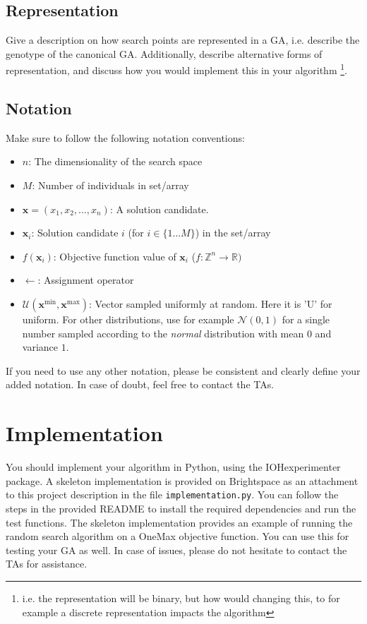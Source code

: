 \documentclass[runningheads]{llncs}
\begin{document}
\subsection{Representation}
Give a description on how search points are represented in a GA, i.e. describe the genotype of the canonical GA. Additionally, describe alternative forms of representation, and discuss how you would implement this in your algorithm \footnote{i.e. the representation will be binary, but how would changing this, to for example a discrete representation impacts the algorithm}. 


\subsection{Notation}
Make sure to follow the following notation conventions:
\begin{itemize}
    \item $n$: The dimensionality of the search space
    \item $M$: Number of individuals in set/array
    \item $\mathbf{x}=(x_1,x_2,\dots,x_n)$: A solution candidate. 
    \item $\mathbf{x}_i$: Solution candidate $i$ (for $i \in \{1\dots M\}$) in the set/array
    \item $f(\mathbf{x}_i)$: Objective function value of $\mathbf{x}_i$ ($f: \mathds{Z}^n \rightarrow \mathds{R})$
    \item $\leftarrow$: Assignment operator
    \item $\bm{\mathcal{U}}(\mathbf{x}^{\text{min}},\mathbf{x}^{\text{max}} )$: Vector sampled uniformly at random. Here it is 'U' for uniform. For other distributions, use for example $\bm{\mathcal{N}}(0,1)$ for a single number sampled according to the \textit{normal} distribution with mean $0$ and variance $1$.
\end{itemize}

If you need to use any other notation, please be consistent and clearly define your added notation. In case of doubt, feel free to contact the TAs. 

\section{Implementation}\label{sect:implement}
You should implement your algorithm in Python, using the IOHexperimenter~\cite{IOHprofiler} package. A skeleton implementation is provided on Brightspace as an attachment to this project description in the file \verb!implementation.py!. You can follow the steps in the provided README to install the required dependencies and run the test functions. The skeleton implementation provides an example of running the random search algorithm on a OneMax objective function. You can use this for testing your GA as well. In case of issues, please do not hesitate to contact the TAs for assistance. 
\end{document}
